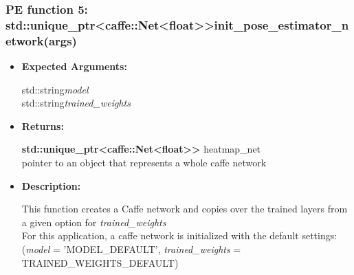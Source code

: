 \documentclass{scrreprt}
\begin{document}
\subsubsection{PE function 5: std::unique\_ptr\textless caffe::Net\textless float\textgreater\textgreater init\_pose\_estimator\_network(args)}
\begin{itemize}
    \item \textbf{Expected Arguments:}

    std::string\quad\textit{model}
    \\
    std::string\quad\textit{trained\_weights}

    \item \textbf{Returns:}

    \textbf{std::unique\_ptr\textless caffe::Net\textless float\textgreater\textgreater} heatmap\_net
    \\
    pointer to an object that represents a whole caffe network

    \item \textbf{Description:}

    This function creates a Caffe network and copies over the trained layers from a given option for \textit{trained\_weights}
    \\
    For this application, a caffe network is initialized with the default settings:
    \\
    (\textit{model} = 'MODEL\_DEFAULT', \textit{trained\_weights} = TRAINED\_WEIGHTS\_DEFAULT)
\end{itemize}
\end{document}
